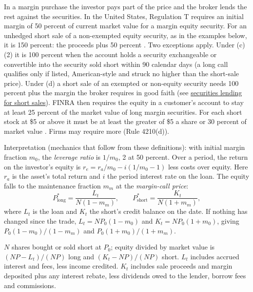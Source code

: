 \begin{qfmethod}\label{meth:margin-purchase-leverage}
 In a margin purchase the investor pays part of the price and the broker lends the rest against the securities. In the United States, Regulation T requires an initial margin of 50 percent of current market value for a margin equity security. For an unhedged short sale of a non-exempted equity security, as in the examples below, it is 150 percent: the proceeds plus 50 percent \citep[12 CFR 220.12(a) and~(c)(1), eCFR text up to date as of 19 October 2026]{ecfr-12cfr220}. Two exceptions apply. Under (c)(2) it is 100 percent when the account holds a security exchangeable or convertible into the security sold short within 90 calendar days (a long call qualifies only if listed, American-style and struck no higher than the short-sale price). Under (d) a short sale of an exempted or non-equity security needs 100 percent plus the margin the broker requires in good faith (see \hyperref[mech:securities-lending-short-sale]{securities lending for short sales}). FINRA then requires the equity in a customer's account to stay at least 25 percent of the market value of long margin securities. For each short stock at \$5 or above it must be at least the greater of \$5 a share or 30 percent of market value \citep[Rule 4210(c)(1)--(3), version from 4 June 2026]{finra-rules-2026}. Firms may require more (Rule 4210(d)).

Interpretation (mechanics that follow from these definitions): with initial margin fraction $m_0$, the \emph{leverage ratio} is $1/m_0$, 2 at 50 percent. Over a period, the return on the investor's equity is $r_e=r_a/m_0-i(1/m_0-1)$ less costs over equity. Here $r_a$ is the asset's total return and $i$ the period interest rate on the loan. The equity falls to the maintenance fraction $m_m$ at the \emph{margin-call price}:
\[ P^*_{\text{long}}=\frac{L_t}{N(1-m_m)},\qquad P^*_{\text{short}}=\frac{K_t}{N(1+m_m)}, \]
where $L_t$ is the loan and $K_t$ the short's credit balance on the date. If nothing has changed since the trade, $L_t=NP_0(1-m_0)$ and $K_t=NP_0(1+m_0)$, giving $P_0(1-m_0)/(1-m_m)$ and $P_0(1+m_0)/(1+m_m)$.

 $N$ shares bought or sold short at $P_0$; equity divided by market value is $(NP-L_t)/(NP)$ long and $(K_t-NP)/(NP)$ short. $L_t$ includes accrued interest and fees, less income credited. $K_t$ includes sale proceeds and margin deposited plus any interest rebate, less dividends owed to the lender, borrow fees and commissions.


\end{qfmethod}
